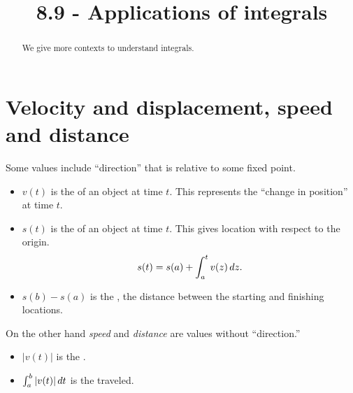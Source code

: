 \documentclass{ximera}
\title{8.9 - Applications of integrals}
\begin{document}
\begin{abstract}
We give more contexts to understand integrals.
\end{abstract}
\maketitle



\section{Velocity and displacement, speed and distance}

Some values include ``direction'' that is relative to some fixed point.


  \begin{itemize}
  \item $v(t)$ is the  of an object at time $t$. This
    represents the ``change in position'' at time $t$.
  \item $s(t)$ is the  of an object at time $t$. This
    gives location with respect to the origin.     \[
    s(t) = s(a)+\int_a^t v(z) \mathop{}\!d z.
    \]
  \item $s(b) -s(a)$ is the , the distance between the
    starting and finishing locations.
  \end{itemize}


On the other hand \textit{speed} and \textit{distance} are values
without ``direction.''


  \begin{itemize}
  \item $|v(t)|$ is the .
  \item $\int_a^b |v(t)| \mathop{}\!d t$ is the  traveled.
  \end{itemize}
\end{document}
